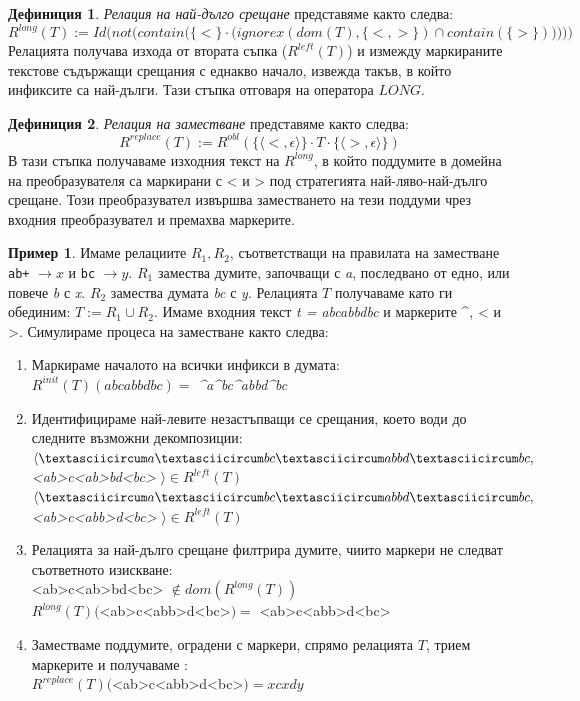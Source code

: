 \documentclass[12pt, oneside]{article}
\theoremstyle{definition}
\newtheorem{definition}{Дефиниция}[section]
\newtheorem{example}{Пример}[section]
\begin{document}
\begin{definition}\label{def:Rlong} \emph{Релация на най-дълго срещане} представяме както следва:
	\[ R^{long}(T) := Id \bigg( not \Big(contain \big(\{<\} \cdot \big(ignorex(dom(T), \{<, >\}) \cap contain(\{>\})\big) \big) \Big) \bigg) \]
	Релацията получава изхода от втората съпка (\(R^{left}(T)\)) и измежду маркираните текстове съдържащи срещания с еднакво начало, извежда такъв, в който инфиксите са най-дълги. Тази стъпка отговаря на оператора \(LONG\).
\end{definition}

\begin{definition}\label{def:Rreplace} \emph{Релация на заместване} представяме както следва:
	\[ R^{replace}(T) := R^{obl}(\{ \langle <, \epsilon \rangle \} \cdot T \cdot \{ \langle >, \epsilon \rangle \}) \]
	В тази стъпка получаваме изходния текст на \(R^{long}\), в който поддумите в домейна на преобразувателя са маркирани с < и > под стратегията най-ляво-най-дълго срещане. Този преобразувател извършва заместването на тези поддуми чрез входния преобразувател и премахва маркерите.
\end{definition}

\begin{example}
	Имаме релациите \( R_1, R_2 \), съответстващи на правилата на заместване \verb/ab+/ \( \to x \) и \verb/bc/ \( \to y \). \(R_1\) замества думите, започващи с \emph{a}, последвано от едно, или повече \emph{b} с \emph{x}. \(R_2\) замества думата \emph{bc} с \emph{y}. Релацията \(T\) получаваме като ги обединим: \( T := R_1 \cup R_2 \). Имаме входния текст \emph{t = abcabbdbc} и маркерите \textasciicircum, < и >. Симулираме процеса на заместване както следва:
	\begin{enumerate}
		\item Маркираме началото на всички инфикси в думата: \\ \( R^{init}(T)(abcabbdbc) = \) \emph{\textasciicircum a\textasciicircum bc\textasciicircum abbd\textasciicircum bc}
		\item Идентифицираме най-левите незастъпващи се срещания, което води до следните възможни декомпозиции: \\ 
		\( \langle \textasciicircum a\textasciicircum bc\textasciicircum abbd\textasciicircum bc,\) \emph{<ab>c<ab>bd<bc>} \(\rangle \in R^{left}(T) \) \\
		\( \langle \textasciicircum a\textasciicircum bc\textasciicircum abbd\textasciicircum bc,\) \emph{<ab>c<abb>d<bc>} \(\rangle \in R^{left}(T) \)
		\item Релацията за най-дълго срещане филтрира думите, чиито маркери не следват съответното изискване: \\
		<ab>c<ab>bd<bc> \( \notin dom(R^{long}(T)) \) \\
		\( R^{long}(T)(\)<ab>c<abb>d<bc>\() = \) <ab>c<abb>d<bc>
		\item Заместваме поддумите, оградени с маркери, спрямо релацията \(T\), трием маркерите и получаваме : \\
		\( R^{replace}(T)(\)<ab>c<abb>d<bc>\() = xcxdy \)
	\end{enumerate}
\end{example}
\end{document}
